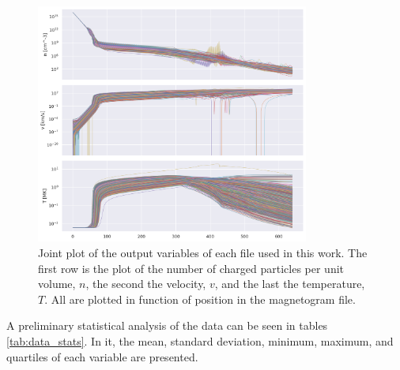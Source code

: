 \begin{figure}[h]
    \centering
    \includegraphics[width=0.8\textwidth]{figures/joint_output_cols.png}
    \caption{Joint plot of the output variables of each file used in this work. The first row is the plot of the number of charged particles per unit volume, $n$, the second the velocity, $v$, and the last the temperature, $T$. All are plotted in function of position in the magnetogram file.}
    \label{fig:jointplot_output}
\end{figure}

A preliminary statistical analysis of the data can be seen in tables \ref{tab:data_stats}. In it, the mean, standard deviation, minimum, maximum, and quartiles of each variable are presented.

